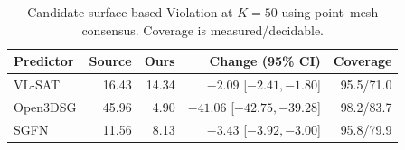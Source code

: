\begin{table}[t]
\centering\small
\begin{tabular}{@{}lrrrr@{}}
\toprule
Predictor & Source & Ours & Change (95\% CI) & Coverage \\
\midrule
VL-SAT & 16.43 & 14.34 & $-2.09$ [$-2.41,-1.80$] & 95.5/71.0 \\
Open3DSG & 45.96 & 4.90 & $-41.06$ [$-42.75,-39.28$] & 98.2/83.7 \\
SGFN & 11.56 & 8.13 & $-3.43$ [$-3.92,-3.00$] & 95.8/79.9 \\
\bottomrule
\end{tabular}
\caption{Candidate surface-based Violation at $K=50$ using point--mesh consensus. Coverage is measured/decidable.}
\label{tab:no-family-surface}
\end{table}
